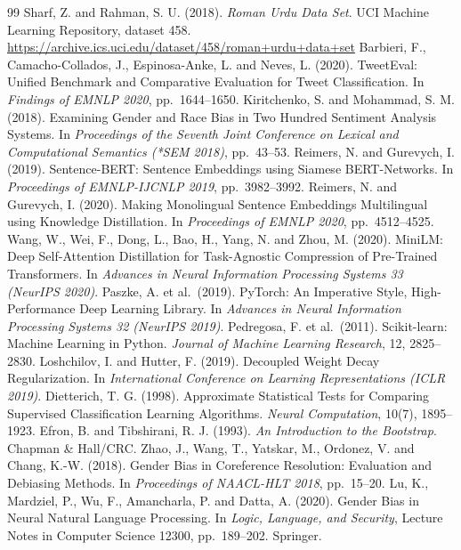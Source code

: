 \documentclass[11pt,a4paper]{article}
\begin{document}
\begin{thebibliography}{99}
 Sharf, Z. and Rahman, S. U. (2018). \emph{Roman Urdu Data Set}. UCI Machine
  Learning Repository, dataset 458. \url{https://archive.ics.uci.edu/dataset/458/roman+urdu+data+set}
 Barbieri, F., Camacho-Collados, J., Espinosa-Anke, L. and Neves, L. (2020).
  TweetEval: Unified Benchmark and Comparative Evaluation for Tweet Classification.
  In \emph{Findings of EMNLP 2020}, pp.\ 1644--1650.
 Kiritchenko, S. and Mohammad, S. M. (2018). Examining Gender and Race Bias in Two
  Hundred Sentiment Analysis Systems. In \emph{Proceedings of the Seventh Joint Conference on
  Lexical and Computational Semantics (*SEM 2018)}, pp.\ 43--53.
 Reimers, N. and Gurevych, I. (2019). Sentence-BERT: Sentence Embeddings using
  Siamese BERT-Networks. In \emph{Proceedings of EMNLP-IJCNLP 2019}, pp.\ 3982--3992.
 Reimers, N. and Gurevych, I. (2020). Making Monolingual Sentence
  Embeddings Multilingual using Knowledge Distillation. In \emph{Proceedings of EMNLP 2020},
  pp.\ 4512--4525.
 Wang, W., Wei, F., Dong, L., Bao, H., Yang, N. and Zhou, M. (2020). MiniLM:
  Deep Self-Attention Distillation for Task-Agnostic Compression of Pre-Trained Transformers.
  In \emph{Advances in Neural Information Processing Systems 33 (NeurIPS 2020)}.
 Paszke, A. et al.\ (2019). PyTorch: An Imperative Style, High-Performance
  Deep Learning Library. In \emph{Advances in Neural Information Processing Systems 32
  (NeurIPS 2019)}.
 Pedregosa, F. et al.\ (2011). Scikit-learn: Machine Learning in Python.
  \emph{Journal of Machine Learning Research}, 12, 2825--2830.
 Loshchilov, I. and Hutter, F. (2019). Decoupled Weight Decay Regularization.
  In \emph{International Conference on Learning Representations (ICLR 2019)}.
 Dietterich, T. G. (1998). Approximate Statistical Tests for Comparing
  Supervised Classification Learning Algorithms. \emph{Neural Computation}, 10(7), 1895--1923.
 Efron, B. and Tibshirani, R. J. (1993). \emph{An Introduction to the
  Bootstrap}. Chapman \& Hall/CRC.
 Zhao, J., Wang, T., Yatskar, M., Ordonez, V. and Chang, K.-W. (2018). Gender
  Bias in Coreference Resolution: Evaluation and Debiasing Methods. In \emph{Proceedings of
  NAACL-HLT 2018}, pp.\ 15--20.
 Lu, K., Mardziel, P., Wu, F., Amancharla, P. and Datta, A. (2020). Gender Bias
  in Neural Natural Language Processing. In \emph{Logic, Language, and Security}, Lecture Notes
  in Computer Science 12300, pp.\ 189--202. Springer.
\end{thebibliography}
\end{document}
